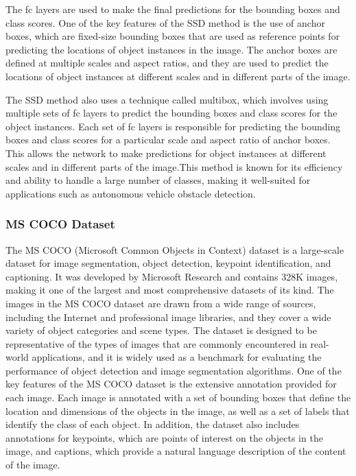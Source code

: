 \noindent
The fc layers are used to make the final predictions for the bounding boxes and class scores. One of the key features of the SSD method is the use of anchor boxes, which are fixed-size bounding boxes that are used as reference points for predicting the locations of object instances in the image. The anchor boxes are defined at multiple scales and aspect ratios, and they are used to predict the locations of object instances at different scales and in different parts of the image.


\noindent
The SSD method also uses a technique called multibox, which involves using multiple sets of fc layers to predict the bounding boxes and class scores for the object instances. Each set of fc layers is responsible for predicting the bounding boxes and class scores for a particular scale and aspect ratio of anchor boxes. This allows the network to make predictions for object instances at different scales and in different parts of the image.This method is known for its efficiency and ability to handle a large number of classes, making it well-suited for applications such as autonomous vehicle obstacle detection.
\subsubsection{MS COCO Dataset}
\noindent
The MS COCO (Microsoft Common Objects in Context) dataset is a large-scale dataset for image segmentation, object detection, keypoint identification, and captioning. It was developed by Microsoft Research and contains 328K images, making it one of the largest and most comprehensive datasets of its kind. The images in the MS COCO dataset are drawn from a wide range of sources, including the Internet and professional image libraries, and they cover a wide variety of object categories and scene types. The dataset is designed to be representative of the types of images that are commonly encountered in real-world applications, and it is widely used as a benchmark for evaluating the performance of object detection and image segmentation algorithms. One of the key features of the MS COCO dataset is the extensive annotation provided for each image. Each image is annotated with a set of bounding boxes that define the location and dimensions of the objects in the image, as well as a set of labels that identify the class of each object. In addition, the dataset also includes annotations for keypoints, which are points of interest on the objects in the image, and captions, which provide a natural language description of the content of the image. 

